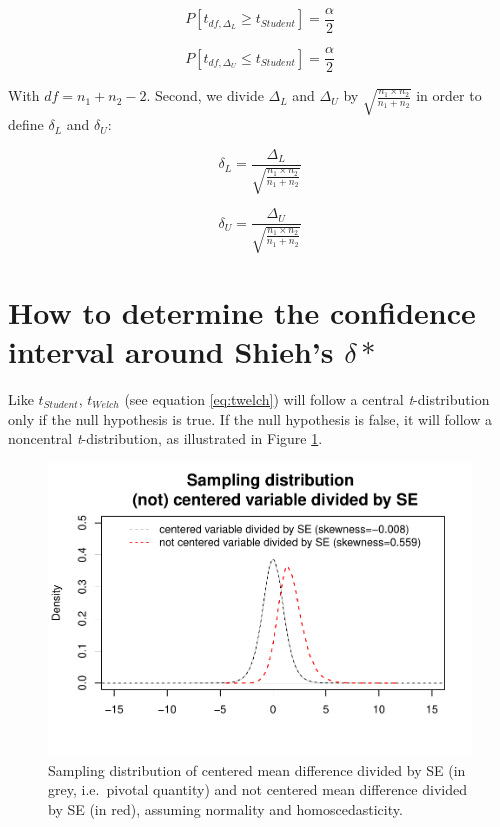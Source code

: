 \documentclass[
  man,floatsintext]{apa6}
\begin{document}
\[P[t_{df, \Delta_L} \geq t_{Student}] = \frac{\alpha}{2} \]

\[P[t_{df, \Delta_U} \leq t_{Student}] = \frac{\alpha}{2} \]

With \(df = n_1+n_2-2\). Second, we divide \(\Delta_L\) and \(\Delta_U\) by \(\sqrt{\frac{n_1 \times n_2}{n_1 + n_2}}\) in order to define \(\delta_L\) and \(\delta_U\):

\[\delta_L = \frac{\Delta_L}{\sqrt{\frac{n_1 \times n_2}{n_1 + n_2}}}\]

\[\delta_U = \frac{\Delta_U}{\sqrt{\frac{n_1 \times n_2}{n_1 + n_2}}}\]

\hypertarget{how-to-determine-the-confidence-interval-around-shiehs-delta}{%
\section{\texorpdfstring{How to determine the confidence interval around Shieh's \(\delta*\)}{How to determine the confidence interval around Shieh's \textbackslash delta*}}\label{how-to-determine-the-confidence-interval-around-shiehs-delta}}

Like \(t_{Student}\), \(t_{Welch}\) (see equation \eqref{eq:twelch}) will follow a central \emph{t}-distribution only if the null hypothesis is true. If the null hypothesis is false, it will follow a noncentral \emph{t}-distribution, as illustrated in Figure \ref{fig:SAMPLMEANDIFF4}.

\begin{figure}
\centering
\includegraphics{Appendix2_files/figure-latex/SAMPLMEANDIFF4-1.pdf}
\caption{\label{fig:SAMPLMEANDIFF4}Sampling distribution of centered mean difference divided by SE (in grey, i.e.~pivotal quantity) and not centered mean difference divided by SE (in red), assuming normality and homoscedasticity.}
\end{figure}
\end{document}
